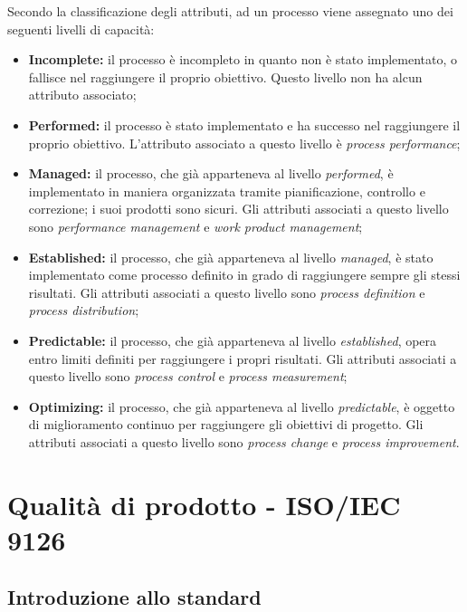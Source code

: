 \documentclass[openany,12pt,a4paper]{report}
\begin{document}
\noindent Secondo la classificazione degli attributi, ad un processo viene assegnato uno dei seguenti livelli di capacità:

\begin{itemize}
    \item \textbf{Incomplete:} il processo è incompleto in quanto non è stato implementato, o fallisce nel raggiungere il proprio obiettivo. Questo livello non ha alcun attributo associato;
    \item \textbf{Performed:} il processo è stato implementato e ha successo nel raggiungere il proprio obiettivo. L'attributo associato a questo livello è \textit{process performance};
    \item \textbf{Managed:} il processo, che già apparteneva al livello \textit{performed}, è implementato in maniera organizzata tramite pianificazione, controllo e correzione; i suoi prodotti sono sicuri. Gli attributi associati a questo livello sono \textit{performance management} e \textit{work product management};
    \item \textbf{Established:} il processo, che già apparteneva al livello \textit{managed}, è stato implementato come processo definito in grado di raggiungere sempre gli stessi risultati. Gli attributi associati a questo livello sono \textit{process definition} e \textit{process distribution};
    \item \textbf{Predictable:} il processo, che già apparteneva al livello \textit{established}, opera entro limiti definiti per raggiungere i propri risultati. Gli attributi associati a questo livello sono \textit{process control} e \textit{process measurement};
    \item \textbf{Optimizing:} il processo, che già apparteneva al livello \textit{predictable}, è oggetto di miglioramento continuo per raggiungere gli obiettivi di progetto. Gli attributi associati a questo livello sono \textit{process change} e \textit{process improvement}.
\end{itemize}

    
\section{Qualità di prodotto - ISO/IEC 9126}    

\subsection{Introduzione allo standard}
\end{document}
